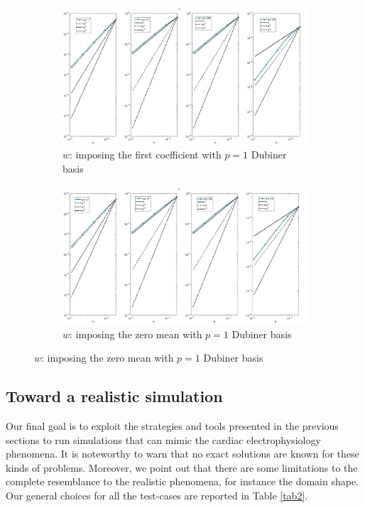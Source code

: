 \documentclass[a4paper,11pt]{article}
\begin{document}
\begin{figure}[H]
\caption{Comparison of the gating variable ($w$)}
\label{w-unique}
\begin{subfigure}{\textwidth}
\begin{center}
\includegraphics[width = \textwidth]{./errors/D1_w_1.jpg}
\caption{$w$: imposing the first coefficient with $p=1$ Dubiner basis}
\end{center}
\end{subfigure}
\begin{subfigure}{\textwidth}
\begin{center}
\includegraphics[width =\textwidth]{./errors/D1_w_2.jpg}
\caption{$w$: imposing the zero mean with $p=1$ Dubiner basis}
\end{center}
\end{subfigure}
\end{figure}
\restoregeometry
\newpage

\subsection{Toward a realistic simulation} \label{real_sim}
Our final goal is to exploit the strategies and tools presented in the previous sections to run simulations that can mimic the cardiac electrophysiology phenomena. It is noteworthy to warn that no exact solutions are known for these kinds of problems. Moreover, we point out that there are some limitations to the complete resemblance to the realistic phenomena, for instance the domain shape. Our general choices for all the test-cases are reported in Table \ref{tab2}.
\end{document}
